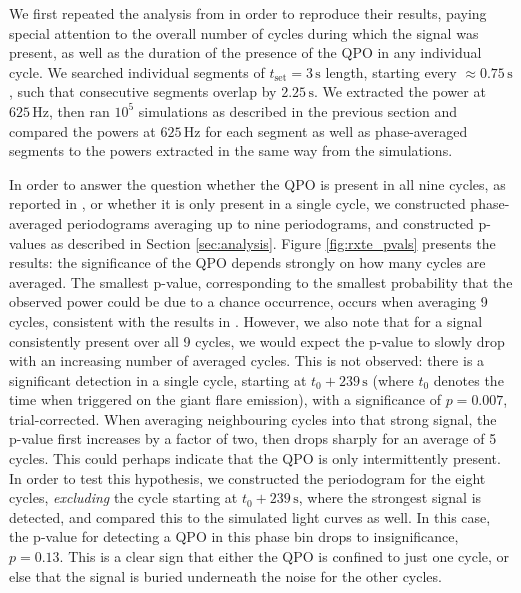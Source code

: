 \documentclass{emulateapj}
\begin{document}
We first repeated the analysis from \citealt{Strohmayer06} in order to reproduce their results, paying special attention to the overall number of cycles during which the signal was present, as well as the duration of the presence of the QPO in any individual cycle.
We searched individual segments of $t_{\mathrm{set}} = 3 \, \mathrm{s}$ length, starting every $\approx 0.75 \, \mathrm{s}$, such that consecutive segments overlap by $2.25 \, \mathrm{s}$. We extracted the power at $625 \, \mathrm{Hz}$, then ran $10^5$ simulations as described in the previous section and compared the powers at $625 \, \mathrm{Hz}$ for each segment as well as phase-averaged segments to the powers extracted in the same way from the simulations.



In order to answer the question whether the QPO is present in all nine cycles, as reported in \citet{Strohmayer06}, or whether it is only present in a single cycle, we constructed phase-averaged periodograms averaging up to nine periodograms, and constructed p-values as described in Section \ref{sec:analysis}. Figure \ref{fig:rxte_pvals} presents the results: the significance of the QPO depends strongly on how many cycles are averaged. The smallest p-value, corresponding to the smallest probability that the observed power could be due to a chance occurrence, occurs when averaging 9 cycles, consistent with the results in \citet{Strohmayer06}. However, we also note that for a signal consistently present over all 9 cycles, we would expect the p-value to slowly drop with an increasing number of averaged cycles. This is not observed: there is a significant detection in a single cycle, starting at $t_0 + 239 \,\mathrm{s}$ (where $t_0$ denotes the time when \rxte triggered on the giant flare emission), with a significance of $p = 0.007$, trial-corrected. When averaging neighbouring cycles into that strong signal, the p-value first increases by a factor of two, then drops sharply for an average of 5 cycles. This could perhaps indicate that the QPO is only intermittently present. In order to test this hypothesis, we constructed the periodogram for the eight cycles, {\it excluding} the cycle starting at $t_0 + 239\, \mathrm{s}$, where the strongest signal is detected, and compared this to the simulated light curves as well. In this case, the p-value for detecting a QPO in this phase bin drops to insignificance, $p = 0.13$. This is a clear sign that either the QPO is confined to just one cycle, or else that the signal is buried underneath the noise for the other cycles. 
\end{document}
